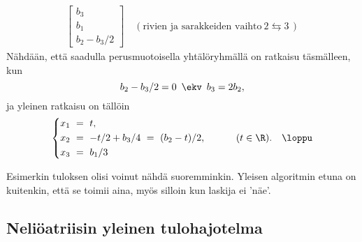 \begin{Exa}
\begin{align*}
\begin{bmatrix} b_3 \\ b_1 \\ b_2 - b_3/2 \end{bmatrix} 
\quad (\text{rivien ja sarakkeiden vaihto}\ 2 \leftrightarrows 3\,)
\end{align*}
Nähdään, että saadulla perusmuotoisella yhtälöryhmällä on ratkaisu täsmälleen, kun
\[
b_2-b_3/2=0\,\ \ekv\,\ b_3 = 2b_2,
\]
ja yleinen ratkaisu on tällöin
\[
\left\{ \begin{aligned} 
x_1\ &=\ t, \\ x_2\ &=\ -t/2 + b_3/4\ =\ (b_2 - t)/2, \\ x_3\ &=\ b_1/3 
\end{aligned} \right. \qquad\quad (t \in \R). \quad\loppu
\]
\end{Exa}
Esimerkin tuloksen olisi voinut nähdä suoremminkin. Yleisen algoritmin etuna on kuitenkin, että
se toimii aina, myös silloin kun laskija ei 'näe'.

\subsection*{Neliöatriisin yleinen tulohajotelma}

